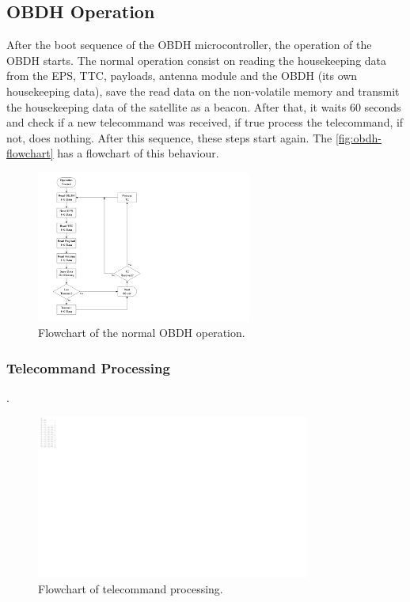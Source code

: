 \subsection{OBDH Operation}

After the boot sequence of the OBDH microcontroller, the operation of the OBDH starts. The normal operation consist on reading the housekeeping data from the EPS, TTC, payloads, antenna module and the OBDH (its own housekeeping data), save the read data on the non-volatile memory and transmit the housekeeping data of the satellite as a beacon. After that, it waits 60 seconds and check if a new telecommand was received, if true process the telecommand, if not, does nothing. After this sequence, these steps start again. The \autoref{fig:obdh-flowchart} has a flowchart of this behaviour.

\begin{figure}[!ht]
    \begin{center}
        \includegraphics[width=0.63\textwidth]{figures/obdh-flowchart.pdf}
        \caption{Flowchart of the normal OBDH operation.}
        \label{fig:obdh-flowchart}
    \end{center}
\end{figure}

\subsubsection{Telecommand Processing}

.

\begin{figure}[!ht]
    \begin{center}
        \includegraphics[width=0.8\textwidth]{figures/tc-flowchart.pdf}
        \caption{Flowchart of telecommand processing.}
        \label{fig:tc-flowchart}
    \end{center}
\end{figure}

